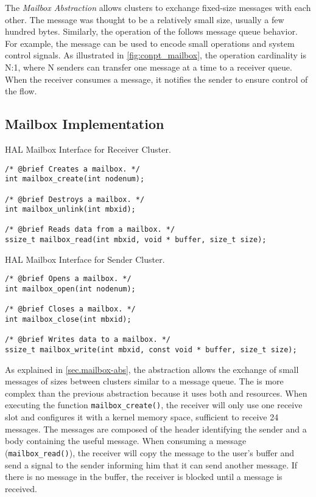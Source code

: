 
			The \textit{Mailbox Abstraction} allows clusters to exchange fixed-size
			messages with each other.
			The message was thought to be a relatively small size, usually a few hundred bytes.
			Similarly, the operation of the \mailbox follows \posix message queue behavior.
			For example, the message can be used to encode small operations and system
			control signals.
			As illustrated in \autoref{fig:conpt_mailbox}, the operation cardinality is N:1,
			where N senders can transfer one message at a time to a receiver queue.
			When the receiver consumes a message, it notifies the sender to ensure
			control of the flow.

			\subsection*{Mailbox Implementation}

\begin{listing}[!tb]
\caption{HAL Mailbox Interface for Receiver Cluster.}
\label{code:mailbox-receiver}
\begin{verbatim}
/* @brief Creates a mailbox. */
int mailbox_create(int nodenum);

/* @brief Destroys a mailbox. */
int mailbox_unlink(int mbxid);

/* @brief Reads data from a mailbox. */
ssize_t mailbox_read(int mbxid, void * buffer, size_t size);
\end{verbatim}
\end{listing}

\begin{listing}[!tb]
\caption{HAL Mailbox Interface for Sender Cluster.}
\label{code:mailbox-sender}
\begin{verbatim}
/* @brief Opens a mailbox. */
int mailbox_open(int nodenum);

/* @brief Closes a mailbox. */
int mailbox_close(int mbxid);

/* @brief Writes data to a mailbox. */
ssize_t mailbox_write(int mbxid, const void * buffer, size_t size);
\end{verbatim}
\end{listing}

				As explained in \autoref{sec.mailbox-abs}, the \mailbox abstraction
				allows the exchange of small messages of sizes between clusters similar
				to a \posix message queue.
				The \mailbox is more complex than the previous abstraction because it
				uses both \dnoc and \cnoc resources.
				When executing the function \texttt{mailbox\_create()}, the receiver
				will only use one \dnoc receive slot and configures it with a kernel
				memory space, sufficient to receive 24 messages.
				The messages are composed of the header identifying the sender
				and a body containing the useful message.
				When consuming a message (\texttt{mailbox\_read()}), the receiver
				will copy the message to the user's buffer and send a signal
				to the sender informing him that it can send another message.
				If there is no message in the buffer, the receiver is blocked
				until a message is received.


